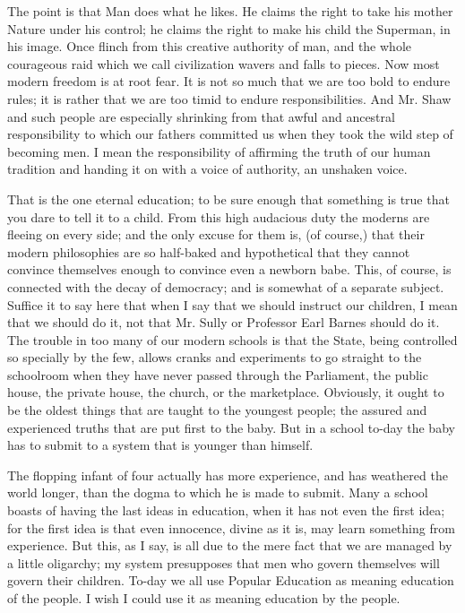 \documentclass[final,10pt,letterpaper,twocolumn,openany]{book}
\begin{document}
The point is that Man does what he likes. He claims the right to take
his mother Nature under his control; he claims the right to make his child
the Superman, in his image. Once flinch from this creative authority of
man, and the whole courageous raid which we call civilization wavers and
falls to pieces. Now most modern freedom is at root fear. It is not so much
that we are too bold to endure rules; it is rather that we are too timid to
endure responsibilities. And Mr. Shaw and such people are especially
shrinking from that awful and ancestral responsibility to which our fathers
committed us when they took the wild step of becoming men. I mean the
responsibility of affirming the truth of our human tradition and handing it
on with a voice of authority, an unshaken voice. 

That is the one eternal
education; to be sure enough that something is true that you dare to tell it
to a child. From this high audacious duty the moderns are fleeing on every
side; and the only excuse for them is, (of course,) that their modern
philosophies are so half-baked and hypothetical that they cannot convince
themselves enough to convince even a newborn babe. This, of course, is
connected with the decay of democracy; and is somewhat of a separate
subject. Suffice it to say here that when I say that we should instruct our
children, I mean that we should do it, not that Mr. Sully or Professor Earl
Barnes should do it. The trouble in too many of our modern schools is that
the State, being controlled so specially by the few, allows cranks and
experiments to go straight to the schoolroom when they have never passed
through the Parliament, the public house, the private house, the church, or
the marketplace. Obviously, it ought to be the oldest things that are taught
to the youngest people; the assured and experienced truths that are put first
to the baby. But in a school to-day the baby has to submit to a system that
is younger than himself. 

The flopping infant of four actually has more
experience, and has weathered the world longer, than the dogma to which
he is made to submit. Many a school boasts of having the last ideas in
education, when it has not even the first idea; for the first idea is that even
innocence, divine as it is, may learn something from experience. But this,
as I say, is all due to the mere fact that we are managed by a little
oligarchy; my system presupposes that men who govern themselves will
govern their children. To-day we all use Popular Education as meaning
education of the people. I wish I could use it as meaning education by the
people.
\end{document}
